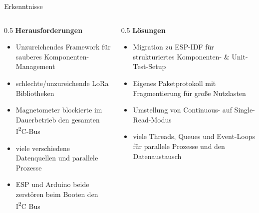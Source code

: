\begin{frame}{Erkenntnisse}
  \begin{columns}[T,onlytextwidth]
    \begin{column}{0.5\textwidth}
      \textbf{\faExclamationTriangle\; Herausforderungen}
      \begin{itemize}
        \item Unzureichendes Framework für
              sauberes Komponenten-Management
        \item schlechte/unzureichende LoRa Bibliotheken
        \item Magnetometer blockierte im Dauerbetrieb den gesamten
              I\textsuperscript{2}C-Bus
        \item viele verschiedene Datenquellen und parallele Prozesse
        \item ESP und Arduino beide zerstören beim Booten den I\textsuperscript{2}C Bus
      \end{itemize}
    \end{column}
    \begin{column}{0.5\textwidth}
      \textbf{\faLightbulb\; Lösungen}
      \begin{itemize}
        \item Migration zu ESP-IDF für strukturiertes
              Komponenten- \& Unit-Test-Setup
        \item Eigenes Paketprotokoll mit Fragmentierung für große
              Nutzlasten
        \item Umstellung von Continuous- auf Single-Read-Modus
        \item viele Threads, Queues und Event-Loops für parallele Prozesse und den Datenaustausch
      \end{itemize}
    \end{column}
  \end{columns}
\end{frame}
